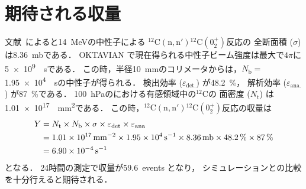 \documentclass[../master]{subfiles}
\begin{document}
\section{期待される収量}
文献~\cite{takahashietal,kondoetal}によると\SI{14}{\mega\electronvolt}の中性子による
${}^{12}\mathrm{C}(\mathrm{n},\mathrm{n}'){}^{12}\mathrm{C}(0_{2}^{+})$反応の
全断面積 ($\sigma$) は\SI{8.36}{\milli\barn}である．
OKTAVIAN で現在得られる中性子ビーム強度は最大で$4\pi$に\SI{5e9}{\per\second}である．
この時，半径\SI{10}{\milli\metre}のコリメータからは，$N_{\text{b}}=$\SI{1.95e4}{\per\second}の中性子が得られる．
検出効率 ($\varepsilon_{\text{det.}}$) が\SI{48.2}{\percent}，
解析効率 ($\varepsilon_{\text{ana.}}$) が\SI{87}{\percent}である．
\SI{100}{\hecto\pascal}の\isoButaneHydro における有感領域中の${}^{12}\mathrm{C}$の
面密度 ($N_{\text{t}}$) は\SI{1.01e17}{\per\square\milli\metre}である．
この時，${}^{12}\mathrm{C}(\mathrm{n},\mathrm{n}'){}^{12}\mathrm{C}(0_{2}^{+})$反応の収量は
\begin{align}
  Y &= N_{\text{t}}\times N_{\text{b}}\times \sigma \times\varepsilon_{\text{det}}\times\varepsilon_{\text{ana}} \notag\\
  &= \SI{1.01e17}{\per\square\milli\metre}\times\SI{1.95e4}{\per\second}\times\SI{8.36}{\milli\barn}
  \times\SI{48.2}{\percent}\times\SI{87}{\percent} \notag\\
  &= \SI{6.90e-4}{\per\second}
\end{align}
となる．
24時間の測定で収量が59.6~events となり，
シミュレーションとの比較を十分行えると期待される．
\end{document}
